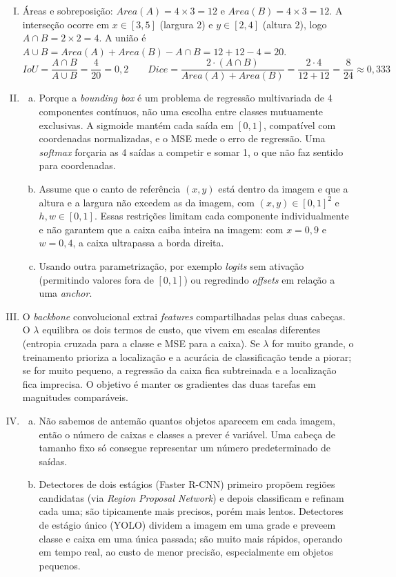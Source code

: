 \documentclass{dlproblemset}
\begin{document}
\begin{enumerate}[I)]
\item Áreas e sobreposição: $Area(A) = 4 \times 3 = 12$ e $Area(B) = 4 \times 3 = 12$. A interseção ocorre em $x \in [3, 5]$ (largura 2) e $y \in [2, 4]$ (altura 2), logo $A \cap B = 2 \times 2 = 4$. A união é $A \cup B = Area(A) + Area(B) - A \cap B = 12 + 12 - 4 = 20$.
$$IoU = \frac{A \cap B}{A \cup B} = \frac{4}{20} = 0{,}2 \qquad Dice = \frac{2 \cdot (A \cap B)}{Area(A) + Area(B)} = \frac{2 \cdot 4}{12 + 12} = \frac{8}{24} \approx 0{,}333$$

\item
\begin{enumerate}[a.]
    \item Porque a \textit{bounding box} é um problema de regressão multivariada de 4 componentes contínuos, não uma escolha entre classes mutuamente exclusivas. A sigmoide mantém cada saída em $[0,1]$, compatível com coordenadas normalizadas, e o MSE mede o erro de regressão. Uma \textit{softmax} forçaria as 4 saídas a competir e somar 1, o que não faz sentido para coordenadas.
    \item Assume que o canto de referência $(x, y)$ está dentro da imagem e que a altura e a largura não excedem as da imagem, com $(x, y) \in [0,1]^2$ e $h, w \in [0,1]$. Essas restrições limitam cada componente individualmente e não garantem que a caixa caiba inteira na imagem: com $x = 0{,}9$ e $w = 0{,}4$, a caixa ultrapassa a borda direita.
    \item Usando outra parametrização, por exemplo \textit{logits} sem ativação (permitindo valores fora de $[0,1]$) ou regredindo \textit{offsets} em relação a uma \textit{anchor}.
\end{enumerate}

\item O \textit{backbone} convolucional extrai \textit{features} compartilhadas pelas duas cabeças. O $\lambda$ equilibra os dois termos de custo, que vivem em escalas diferentes (entropia cruzada para a classe e MSE para a caixa). Se $\lambda$ for muito grande, o treinamento prioriza a localização e a acurácia de classificação tende a piorar; se for muito pequeno, a regressão da caixa fica subtreinada e a localização fica imprecisa. O objetivo é manter os gradientes das duas tarefas em magnitudes comparáveis.

\item
\begin{enumerate}[a.]
    \item Não sabemos de antemão quantos objetos aparecem em cada imagem, então o número de caixas e classes a prever é variável. Uma cabeça de tamanho fixo só consegue representar um número predeterminado de saídas.
    \item Detectores de dois estágios (Faster R-CNN) primeiro propõem regiões candidatas (via \textit{Region Proposal Network}) e depois classificam e refinam cada uma; são tipicamente mais precisos, porém mais lentos. Detectores de estágio único (YOLO) dividem a imagem em uma grade e preveem classe e caixa em uma única passada; são muito mais rápidos, operando em tempo real, ao custo de menor precisão, especialmente em objetos pequenos.
\end{enumerate}


\end{enumerate}
\end{document}
